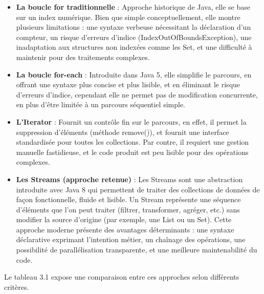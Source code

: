 \documentclass[12pt,a4paper]{report}
\begin{document}
	\begin{itemize}
		
		\item \textbf{La boucle for traditionnelle} : Approche historique de Java, elle se base sur un index numérique. Bien que simple conceptuellement, elle montre plusieurs limitations : une syntaxe verbeuse nécessitant la déclaration d'un compteur, un risque d'erreurs d'indice (IndexOutOfBoundsException),  une inadaptation aux structures non indexées comme les Set, et une difficulté à maintenir pour des traitements complexes.
		
		\item \textbf{La boucle for-each} : Introduite dans Java 5, elle simplifie le parcours, en offrant une syntaxe plus concise et plus lisible, et en éliminant le risque d'erreurs d'indice, cependant elle ne permet pas de modification concurrente, en plus d'être limitée à un parcours séquentiel simple.
		
		\item \textbf{L'Iterator} : Fournit un contrôle fin sur le parcours, en effet, il permet la suppression d'éléments (méthode remove()), et fournit une interface standardisée pour toutes les collections. Par contre, il requiert une gestion manuelle fastidieuse, et le code produit est peu lisible pour des opérations complexes.
		
		\item \textbf{Les Streams (approche retenue)} :  Les Streams sont une abstraction introduite avec Java 8 qui permettent de traiter des collections de données de façon fonctionnelle, fluide et lisible. Un Stream représente une séquence d’éléments que l’on peut traiter (filtrer, transformer, agréger, etc.) sans modifier la source d’origine (par exemple, une List ou un Set). Cette approche moderne présente des avantages déterminants : une syntaxe déclarative exprimant l'intention métier, un chaînage des opérations, une possibilité de parallélisation transparente, et une meilleure maintenabilité du code.
		
	\end{itemize}
	
	Le tableau 3.1 expose une comparaison entre ces approches selon différents critères.
	
\end{document}
